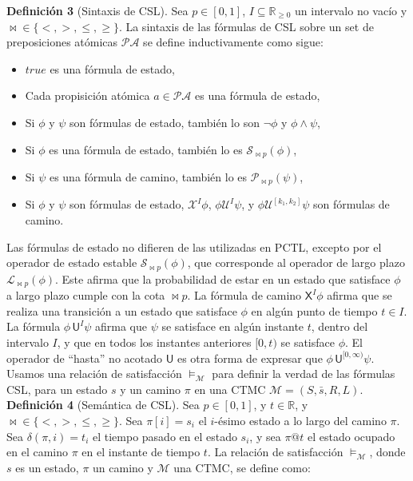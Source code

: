 \documentclass{article}
\begin{document}
\textbf{Definición 3} (Sintaxis de CSL). Sea $p\in[0,1]$, $I\subseteq\mathbb{R}_{\ge0}$ un intervalo no vacío y $\bowtie\in\{<,>,\le,\ge\}$. La sintaxis de las fórmulas de CSL sobre un set de preposiciones atómicas $\mathcal{PA}$ se define inductivamente como sigue:
\begin{itemize}
    \item $true$ es una fórmula de estado,
    \item Cada propisición atómica $a\in\mathcal{PA}$ es una fórmula de estado,
    \item Si $\phi$ y $\psi$ son fórmulas de estado, también lo son $\neg\phi$ y $\phi\land\psi$,
    \item Si $\phi$ es una fórmula de estado, también lo es $\mathcal{S}_{\bowtie p}(\phi)$,
    \item Si $\psi$ es una fórmula de camino, también lo es $\mathcal{P}_{\bowtie p}(\psi)$,
    \item Si $\phi$ y $\psi$ son fórmulas de estado, $\mathcal{X}^I\phi$, $\phi\mathcal{U}^I\psi$, y $\phi\mathcal{U}^{[k_1,k_2]}\psi$ son fórmulas de camino.
\end{itemize}\par

Las fórmulas de estado no difieren de las utilizadas en PCTL, excepto por el operador de estado estable $\mathcal{S}_{\bowtie p}(\phi)$, que corresponde al operador de largo plazo $\mathcal{L}_{\bowtie p}(\phi)$. Este afirma que la probabilidad de estar en un estado que satisface $\phi$ a largo plazo cumple con la cota $\bowtie p$. La fórmula de camino $\mathsf{X}^I \phi$ afirma que se realiza una transición a un estado que satisface $\phi$ en algún punto de tiempo $t \in I$. La fórmula $\phi \, \mathsf{U}^I \psi$ afirma que $\psi$ se satisface en algún instante $t$, dentro del intervalo $I$, y que en todos los instantes anteriores $[0, t)$ se satisface $\phi$. El operador de ``hasta'' no acotado $\mathsf{U}$ es otra forma de expresar que $\phi \, \mathsf{U}^{[0,\infty)} \psi$. Usamos una relación de satisfacción $\models_\mathcal{M}$ para definir la verdad de las fórmulas CSL, para un estado $s$ y un camino $\pi$ en una CTMC $\mathcal{M} = (S, \bar{s}, R, L)$.\\

\textbf{Definición 4} (Semántica de CSL). Sea $p \in [0,1]$, y $t \in \mathbb{R}$, y $\bowtie \in \{<, >, \leq, \geq\}$. Sea $\pi[i] = s_i$ el $i$-ésimo estado a lo largo del camino $\pi$. Sea $\delta(\pi, i) = t_i$ el tiempo pasado en el estado $s_i$, y sea $\pi@t$ el estado ocupado en el camino $\pi$ en el instante de tiempo $t$.
La relación de satisfacción $\models_\mathcal{M}$, donde $s$ es un estado, $\pi$ un camino y $\mathcal{M}$ una CTMC, se define como:
\end{document}
